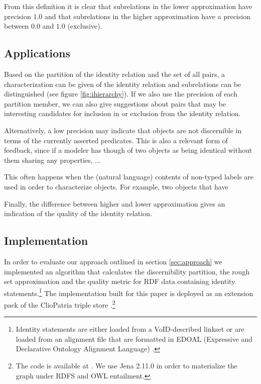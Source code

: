 \noindent From this definition it is clear that
    subrelations in the lower approximation have precision $1.0$
  and that
    subrelations in the higher approximation have a precision
      between $0.0$ and $1.0$ (exclusive).



\subsection{Applications}
\label{sec:applications}

Based on the partition of the identity relation and the set of all pairs,
  a characterization can be given of the identity relation
  and subrelations can be distinguished (see figure \ref{fig:ihierarchy}).
If we also use the precision of each partition member,
  we can also give suggestions about pairs that may be interesting candidates
  for inclusion in or exclusion from the identity relation.

Alternatively, a low precision may indicate that objects are not
  discernible in terms of the currently asserted predicates.
This is also a relevant form of feedback,
  since if a modeler has though of two objects as being identical
  without them sharing any properties, ...

This often happens when the (natural language) contents of non-typed labels
  are used in order to characterize objects.
For example, two objects that have 

Finally, the difference between higher and lower approximation
  gives an indication of the quality of the identity relation.



\subsection{Implementation}
\label{sec:implementation}

In order to evaluate our approach outlined in section \ref{sec:approach}
  we implemented an algorithm that calculates
  the discernibility partition, the rough set approximation and
  the quality metric
  for RDF data containing identity statements.\footnote{
      Identity statements are either loaded from a VoID-described
        linkset \cite{Void2011}
        or are loaded from an alignment file that are formatted in
        EDOAL (Expressive and Declarative Ontology Alignment Language)
        \cite{DavidEzenatScharffeTrojahn2011}.
    }
The implementation built for this paper is deployed as an extension pack
  of the ClioPatria triple store .\footnote{
      The code is available at {\small {}}.
      We use Jena 2.11.0 \cite{Carroll2004} in order to materialize
        the graph under RDFS and OWL entailment.
    }


